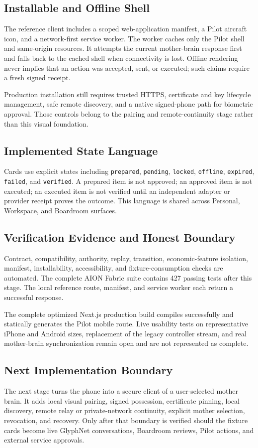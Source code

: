 \subsection{Installable and Offline Shell}

The reference client includes a scoped web-application manifest, a Pilot aircraft icon,
and a network-first service worker.  The worker caches only the Pilot shell and same-origin
resources.  It attempts the current mother-brain response first and falls back to the
cached shell when connectivity is lost.  Offline rendering never implies that an action
was accepted, sent, or executed; such claims require a fresh signed receipt.

Production installation still requires trusted HTTPS, certificate and key lifecycle
management, safe remote discovery, and a native signed-phone path for biometric approval.
Those controls belong to the pairing and remote-continuity stage rather than this visual
foundation.

\subsection{Implemented State Language}

Cards use explicit states including \texttt{prepared}, \texttt{pending},
\texttt{locked}, \texttt{offline}, \texttt{expired}, \texttt{failed}, and
\texttt{verified}.  A prepared item is not approved; an approved item is not executed;
an executed item is not verified until an independent adapter or provider receipt proves
the outcome.  This language is shared across Personal, Workspace, and Boardroom surfaces.

\subsection{Verification Evidence and Honest Boundary}

Contract, compatibility, authority, replay, transition, economic-feature isolation,
manifest, installability, accessibility, and fixture-consumption checks are automated.
The complete AION Fabric suite contains 427 passing tests after this stage.  The local
reference route, manifest, and service worker each return a successful response.

The complete optimized Next.js production build compiles successfully and statically
generates the Pilot mobile route.  Live usability tests on representative iPhone and
Android sizes, replacement of the legacy controller stream, and real mother-brain
synchronization remain open and are not represented as complete.

\subsection{Next Implementation Boundary}

The next stage turns the phone into a secure client of a user-selected mother brain.  It
adds local visual pairing, signed possession, certificate pinning, local discovery,
remote relay or private-network continuity, explicit mother selection, revocation, and
recovery.  Only after that boundary is verified should the fixture cards become live
GlyphNet conversations, Boardroom reviews, Pilot actions, and external service approvals.
